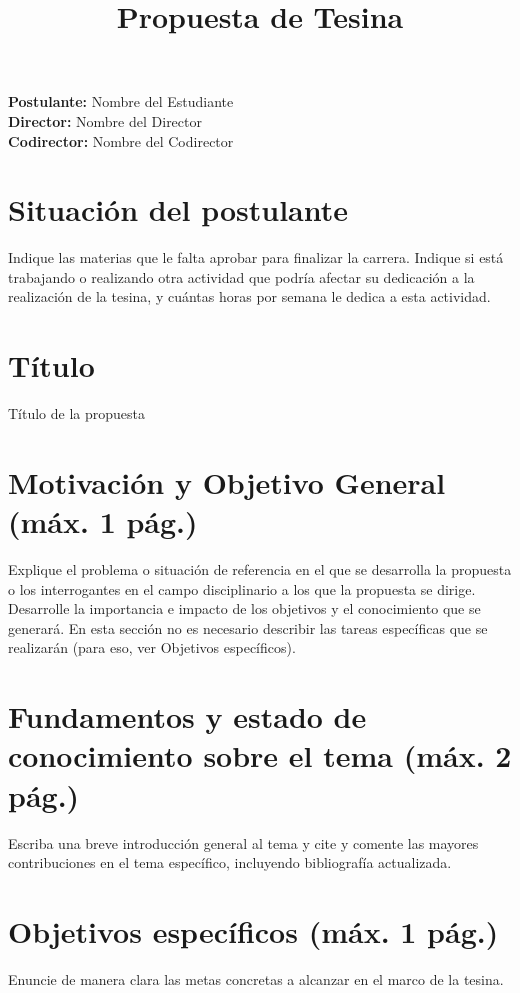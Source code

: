 \documentclass[a4paper,12pt]{article}
\title{Propuesta de Tesina}
\author{}
\begin{document}
\maketitle

\begin{flushleft}
\textbf{Postulante:} Nombre del Estudiante \\
\textbf{Director:} Nombre del Director \\
\textbf{Codirector:} Nombre del Codirector \\
\end{flushleft}

\section{Situación del postulante}
Indique las materias que le falta aprobar para finalizar la carrera. Indique si está trabajando o realizando otra actividad que podría afectar su dedicación a la realización de la tesina, y cuántas horas por semana le dedica a esta actividad.

\section{Título}
Título de la propuesta

\section{Motivación y Objetivo General (máx. 1 pág.)}
Explique el problema o situación de referencia en el que se desarrolla la propuesta o los interrogantes en el campo disciplinario a los que la propuesta se dirige. Desarrolle la importancia e impacto de los objetivos y el conocimiento que se generará. En esta sección no es necesario describir las tareas específicas que se realizarán (para eso, ver Objetivos específicos).

\section{Fundamentos y estado de conocimiento sobre el tema (máx. 2 pág.)}
Escriba una breve introducción general al tema y cite y comente las mayores contribuciones en el tema específico, incluyendo bibliografía actualizada.

\section{Objetivos específicos (máx. 1 pág.)}
Enuncie de manera clara las metas concretas a alcanzar en el marco de la tesina.
\end{document}
